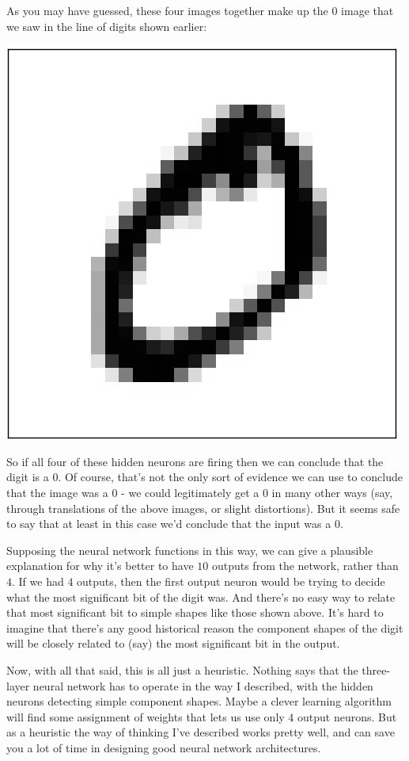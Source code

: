 \documentclass[a4paper,12pt]{report}%
\begin{document}
As you may have guessed, these four images together make up the $0$ image that we saw in the line of digits shown earlier:
\begin{center}
 \includegraphics[width=0.15\linewidth]{images/mnist_complete_zero.png}
\end{center}

So if all four of these hidden neurons are firing then we can conclude that the digit is a $0$. Of course, that's not the only sort of evidence we can use to conclude that the image was a $0$ - we could legitimately get a $0$ in many other ways (say, through translations of the above images, or slight distortions). But it seems safe to say that at least in this case we'd conclude that the input was a $0$.

Supposing the neural network functions in this way, we can give a plausible explanation for why it's better to have $10$ outputs from the network, rather than $4$. If we had $4$ outputs, then the first output neuron would be trying to decide what the most significant bit of the digit was. And there's no easy way to relate that most significant bit to simple shapes like those shown above. It's hard to imagine that there's any good historical reason the component shapes of the digit will be closely related to (say) the most significant bit in the output.

Now, with all that said, this is all just a heuristic. Nothing says that the three-layer neural network has to operate in the way I described, with the hidden neurons detecting simple component shapes. Maybe a clever learning algorithm will find some assignment of weights that lets us use only $4$ output neurons. But as a heuristic the way of thinking I've described works pretty well, and can save you a lot of time in designing good neural network architectures.
\end{document}
